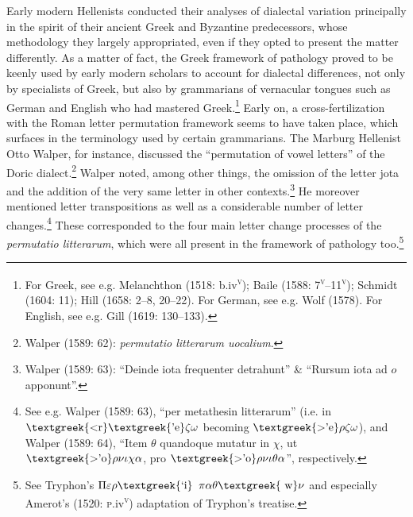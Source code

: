 \begin{styleStandard}
Early modern Hellenists conducted their analyses of dialectal variation principally in the spirit of their ancient Greek and Byzantine predecessors, whose methodology they largely appropriated, even if they opted to present the matter differently. As a matter of fact, the Greek framework of pathology proved to be keenly used by early modern scholars to account for dialectal differences, not only by specialists of Greek, but also by grammarians of vernacular tongues such as German and English who had mastered Greek.\footnote{\textrm{ For Greek, see e.g. Melanchthon (1518: b.iv}\textrm{\textsc{\textsuperscript{v}}}\textrm{); Baile (1588: 7}\textrm{\textsc{\textsuperscript{v}}}\textrm{–11}\textrm{\textsc{\textsuperscript{v}}}\textrm{); Schmidt (1604: 11); Hill (1658: 2–8, 20–22). For German, see e.g. Wolf (1578). For English, see e.g. Gill (1619: 130–133).}} Early on, a cross-fertilization with the Roman letter permutation framework seems to have taken place, which surfaces in the terminology used by certain grammarians. The Marburg Hellenist Otto Walper, for instance, discussed the “permutation of vowel letters” of the Doric dialect.\footnote{\textrm{ Walper (1589: 62): }\textrm{\textit{permutatio litterarum uocalium}}\textrm{.}} Walper noted, among other things, the omission of the letter jota and the addition of the very same letter in other contexts.\footnote{\textrm{ Walper (1589: 63): “Deinde iota frequenter detrahunt” \& “Rursum iota ad $o$ apponunt”.}} He moreover mentioned letter transpositions as well as a considerable number of letter changes.\footnote{\textrm{ See e.g. Walper (1589: 63), “per metathesin litterarum” (i.e. in $\text{\textgreek{<r}}\text{\textgreek{'e}}\zeta \omega $ becoming $\text{\textgreek{>'e}}\rho \zeta \omega $), and Walper (1589: 64), “Item $\theta $ quandoque mutatur in $\chi $, ut $\text{\textgreek{>'o}}\rho \nu \iota \chi \alpha $, pro $\text{\textgreek{>'o}}\rho \nu \iota \theta \alpha $”, respectively.}} These corresponded to the four main letter change processes of the \textit{permutatio litterarum}, which were all present in the framework of pathology too.\footnote{\textrm{ See Tryphon’s $\Pi \varepsilon \rho \text{\textgreek{`i}}$ $\pi \alpha \theta \text{\textgreek{~w}}\nu $ and especially Amerot’s (1520: }\textrm{\textsc{p.}}\textrm{iv}\textrm{\textsc{\textsuperscript{v}}}\textrm{\textsc{)}}\textrm{ adaptation of Tryphon’s treatise.}}
\end{styleStandard}

